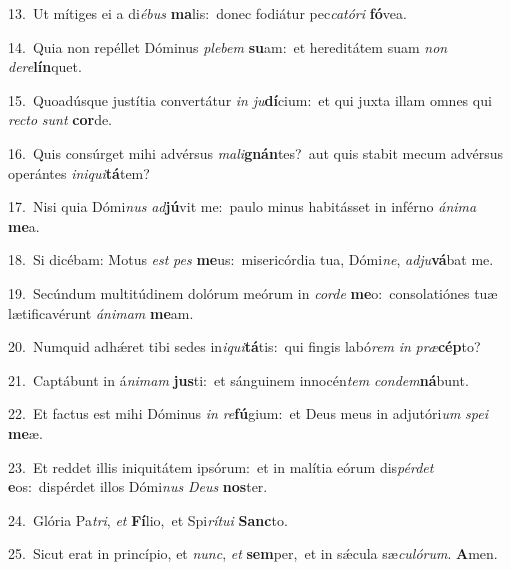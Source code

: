 {\numbfont\textcolor{\numbcolor}{13.}}~Ut mítiges ei a di\-\textit{é}\-\textit{bus} \textbf{ma}\-lis:~\star donec fodiátur pec\-\textit{ca}\-\textit{tó}\textit{ri} \textbf{fó}\-vea.\par
{\numbfont\textcolor{\numbcolor}{14.}}~Quia non repéllet Dóminus \textit{ple}\-\textit{bem} \textbf{su}\-am:~\star et hereditátem suam \textit{non} \textit{de}\-\textit{re}\textbf{lín}quet.\par
{\numbfont\textcolor{\numbcolor}{15.}}~Quoadúsque justítia convertátur \textit{in} \textit{ju}\-\textbf{dí}cium:~\star et qui juxta illam omnes qui \textit{rec}\-\textit{to} \textit{sunt} \textbf{cor}\-de.\par
{\numbfont\textcolor{\numbcolor}{16.}}~Quis consúrget mihi advérsus \textit{ma}\-\textit{li}\textbf{gnán}tes?~\star aut quis stabit mecum advérsus operántes \textit{in}\-\textit{i}\textit{qui}\textbf{tá}tem?\par
{\numbfont\textcolor{\numbcolor}{17.}}~Nisi quia Dómi\textit{nus} \textit{ad}\-\textbf{jú}vit me:~\star paulo minus habitásset in inférno \textit{á}\-\textit{ni}\textit{ma} \textbf{me}\-a.\par
{\numbfont\textcolor{\numbcolor}{18.}}~Si dicébam: Motus \textit{est} \textit{pes} \textbf{me}\-us:~\star misericórdia tua, Dómi\-\textit{ne}\-, \textit{ad}\-\textit{ju}\textbf{vá}bat me.\par
{\numbfont\textcolor{\numbcolor}{19.}}~Secúndum multitúdinem dolórum meórum in \textit{cor}\-\textit{de} \textbf{me}\-o:~\star consolatiónes tuæ lætificavérunt \textit{á}\-\textit{ni}\textit{mam} \textbf{me}\-am.\par
{\numbfont\textcolor{\numbcolor}{20.}}~Numquid adhǽret tibi sedes in\-\textit{i}\-\textit{qui}\textbf{tá}tis:~\star qui fingis labó\textit{rem} \textit{in} \textit{præ}\-\textbf{cép}to?\par
{\numbfont\textcolor{\numbcolor}{21.}}~Captábunt in á\-\textit{ni}\-\textit{mam} \textbf{jus}\-ti:~\star et sánguinem innocén\textit{tem} \textit{con}\-\textit{dem}\textbf{ná}bunt.\par
{\numbfont\textcolor{\numbcolor}{22.}}~Et factus est mihi Dóminus \textit{in} \textit{re}\-\textbf{fú}gium:~\star et Deus meus in adjutóri\textit{um} \textit{spe}\-\textit{i} \textbf{me}\-æ.\par
{\numbfont\textcolor{\numbcolor}{23.}}~Et reddet illis iniquitátem ipsórum:~\dagger et in malítia eórum dis\-\textit{pér}\-\textit{det} \textbf{e}\-os:~\star dispérdet illos Dómi\textit{nus} \textit{De}\-\textit{us} \textbf{nos}\-ter.\par
{\numbfont\textcolor{\numbcolor}{24.}}~Glória Pa\-\textit{tri}\-, \textit{et} \textbf{Fí}\-lio,~\star et Spi\-\textit{rí}\-\textit{tu}\textit{i} \textbf{Sanc}\-to.\par
{\numbfont\textcolor{\numbcolor}{25.}}~Sicut erat in princípio, et \textit{nunc}\-, \textit{et} \textbf{sem}\-per,~\star et in sǽcula sæ\-\textit{cu}\-\textit{ló}\textit{rum}. \textbf{A}\-men.\par
